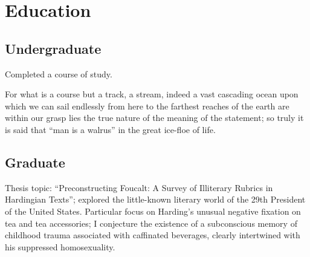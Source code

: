 \documentclass[letterpaper]{resume}
\begin{document}
\author{John Q Random}
\maketitle

\section{Education}

\subsection{Undergraduate}



\begin{compactitem}
\item Completed a course of study.
\item For what is a course but a track, a stream, indeed a vast
  cascading ocean upon which we can sail endlessly from here to the
  farthest reaches of the earth are within our grasp lies the true
  nature of the meaning of the statement; so truly it is said that
  ``man is a walrus'' in the great ice-floe of life.
\end{compactitem}

\subsection{Graduate}


\begin{compactitem}
\item Thesis topic: ``Preconstructing Foucalt: A Survey of Illiterary
  Ru\-brics in Har\-ding\-i\-an Texts''; explored the little-known literary
  world of the 29th President of the United States.  Particular focus
  on Harding's unusual negative fixation on tea and tea accessories; I
  conjecture the existence of a subconscious memory of childhood
  trauma associated with caffinated beverages, clearly intertwined
  with his suppressed homosexuality.
\end{compactitem}
\end{document}
